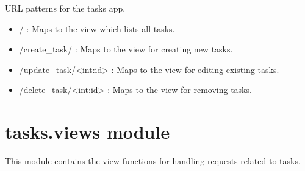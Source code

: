 \documentclass[letterpaper,10pt,english]{sphinxmanual}
\begin{document}
\begin{fulllineitems}
\label{\detokenize{tasks:tasks.urls.urlpatterns}}
\pysigstartsignatures
{}
\pysigstopsignatures
\sphinxAtStartPar
URL patterns for the tasks app.
\begin{description}
\begin{itemize}
\item {} 
\sphinxAtStartPar
/ : Maps to the  view which lists all tasks.

\item {} 
\sphinxAtStartPar
/create\_task/ : Maps to the  view for creating new tasks.

\item {} 
\sphinxAtStartPar
/update\_task/\textless{}int:id\textgreater{} : Maps to the  view for editing existing tasks.

\item {} 
\sphinxAtStartPar
/delete\_task/\textless{}int:id\textgreater{} : Maps to the  view for removing tasks.

\end{itemize}

\end{description}

\end{fulllineitems}



\section{tasks.views module}
\label{\detokenize{tasks:tasks-views-module}}
\sphinxAtStartPar
This module contains the view functions for handling requests related to tasks.
\label{\detokenize{tasks:module-tasks.views}}
\end{document}
